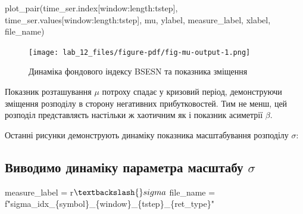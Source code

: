 \documentclass[
  letterpaper,
]{report}
\newenvironment{Shaded}{\begin{snugshade}}{\end{snugshade}}
\newcommand{\NormalTok}[1]{\textcolor[rgb]{0.00,0.23,0.31}{#1}}
\newcommand{\OperatorTok}[1]{\textcolor[rgb]{0.37,0.37,0.37}{#1}}
\newcommand{\SpecialCharTok}[1]{\textcolor[rgb]{0.37,0.37,0.37}{#1}}
\newcommand{\SpecialStringTok}[1]{\textcolor[rgb]{0.13,0.47,0.30}{#1}}
\newcommand{\VerbatimStringTok}[1]{\textcolor[rgb]{0.13,0.47,0.30}{#1}}
\begin{document}
\begin{Shaded}
\begin{Highlighting}[]
\NormalTok{plot\_pair(time\_ser.index[window:length:tstep],}
\NormalTok{          time\_ser.values[window:length:tstep],}
\NormalTok{          mu, }
\NormalTok{          ylabel, }
\NormalTok{          measure\_label,}
\NormalTok{          xlabel,}
\NormalTok{          file\_name)}
\end{Highlighting}
\end{Shaded}

\begin{figure}[H]

{\centering \texttt{[image: lab\_12\_files/figure-pdf/fig-mu-output-1.png]}

}

\caption{\label{fig-mu}Динаміка фондового індексу BSESN та показника
зміщення}

\end{figure}

Показник розташування \(\mu\) потроху спадає у кризовий період,
демонструючи зміщення розподілу в сторону негативних прибутковостей. Тим
не менш, цей розподіл представляєть настільки ж хаотичним як і показник
асиметрії \(\beta\).

Останні рисунки демонструють динаміку показника масштабування розподілу
\(\sigma\):

\hypertarget{ux432ux438ux432ux43eux434ux438ux43cux43e-ux434ux438ux43dux430ux43cux456ux43aux443-ux43fux430ux440ux430ux43cux435ux442ux440ux430-ux43cux430ux441ux448ux442ux430ux431ux443-sigma}{%
\subsection{\texorpdfstring{Виводимо динаміку параметра масштабу
\(\sigma\)}{Виводимо динаміку параметра масштабу \textbackslash sigma}}\label{ux432ux438ux432ux43eux434ux438ux43cux43e-ux434ux438ux43dux430ux43cux456ux43aux443-ux43fux430ux440ux430ux43cux435ux442ux440ux430-ux43cux430ux441ux448ux442ux430ux431ux443-sigma}}

\begin{Shaded}
\begin{Highlighting}[]
\NormalTok{measure\_label }\OperatorTok{=} \VerbatimStringTok{r\textquotesingle{}$\textbackslash{}sigma$\textquotesingle{}}
\NormalTok{file\_name }\OperatorTok{=} \SpecialStringTok{f"sigma\_idx\_}\SpecialCharTok{\{}\NormalTok{symbol}\SpecialCharTok{\}}\SpecialStringTok{\_}\SpecialCharTok{\{}\NormalTok{window}\SpecialCharTok{\}}\SpecialStringTok{\_}\SpecialCharTok{\{}\NormalTok{tstep}\SpecialCharTok{\}}\SpecialStringTok{\_}\SpecialCharTok{\{}\NormalTok{ret\_type}\SpecialCharTok{\}}\SpecialStringTok{"}
\end{Highlighting}
\end{Shaded}
\end{document}
